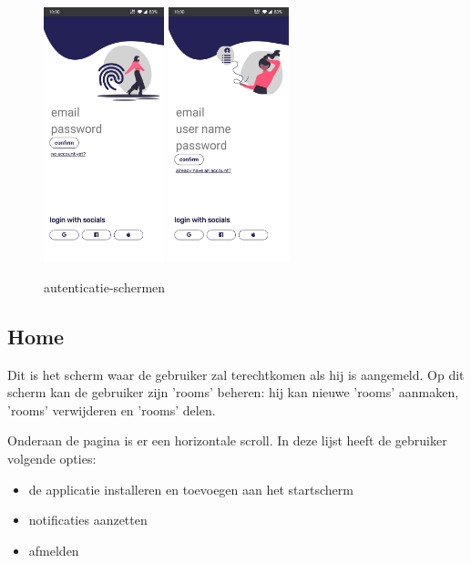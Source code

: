 		
		\begin{figure}[H]
			\centering
			\includegraphics[width=35mm]{./img/POC/login.jpg}{}		\includegraphics[width=35mm]{./img/POC/register.jpg}{}
			\caption{autenticatie-schermen}
		\end{figure}
		
	\subsection{Home}
		Dit is het scherm waar de gebruiker zal terechtkomen als hij is aangemeld. 
		Op dit scherm kan de gebruiker zijn 'rooms' beheren: hij kan nieuwe 'rooms' aanmaken, 'rooms' verwijderen en 'rooms' delen.
		
		Onderaan de pagina is er een horizontale scroll. In deze lijst heeft de gebruiker volgende opties:
		\begin{itemize}
			\item de applicatie installeren en toevoegen aan het startscherm
			\item notificaties aanzetten 
			\item afmelden
		\end{itemize}
		
